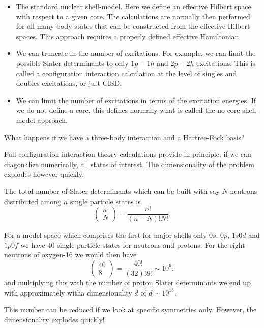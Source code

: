 \begin{itemize}
\item The standard nuclear shell-model. Here we define an effective Hilbert space with respect to a given core. The calculations are normally then performed for all many-body states that can be constructed from the effective Hilbert spaces. This approach requires a properly defined effective Hamiltonian

\item We can truncate in the number of excitations. For example, we can limit the possible Slater determinants to only $1p-1h$ and $2p-2h$ excitations. This is called a configuration interaction calculation at the level of singles and doubles excitations, or just CISD. 

\item We can limit the number of excitations in terms of the excitation energies. If we do not define a core, this defines normally what is called the no-core shell-model approach. 
\end{itemize}

\noindent
What happens if we have a three-body interaction and a Hartree-Fock basis? 

Full configuration interaction theory calculations provide in principle, if we can diagonalize numerically, all states of interest. The dimensionality of the problem explodes however quickly.

The total number of Slater determinants which can be built with say $N$ neutrons distributed among $n$ single particle states is
\[
\left (\begin{array}{c} n \\ N\end{array} \right) =\frac{n!}{(n-N)!N!}. 
\]

For a model space which comprises the first for major shells only $0s$, $0p$, $1s0d$ and $1p0f$ we have $40$ single particle states for neutrons and protons.  For the eight neutrons of oxygen-16 we would then have
\[
\left (\begin{array}{c} 40 \\ 8\end{array} \right) =\frac{40!}{(32)!8!}\sim 10^{9}, 
\]
and multiplying this with the number of proton Slater determinants we end up with approximately witha dimensionality $d$ of $d\sim 10^{18}$.


This number can be reduced if we look at specific symmetries only. However, the dimensionality explodes quickly!

